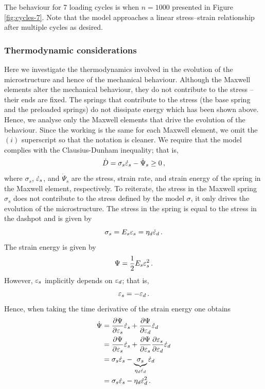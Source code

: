 \documentclass{article}
\begin{document}
The behaviour for 7 loading cycles is when $n=1000$ presented in Figure \ref{fig:cycles-7}.
Note that the model approaches a linear stress--strain relationship after multiple cycles as desired.

\subsubsection{Thermodynamic considerations}
Here we investigate the thermodynamics involved in the evolution of the microstructure and hence of the mechanical behaviour. Although the Maxwell elements alter the mechanical behaviour, they do not contribute to the stress -- their ends are fixed. The springs that contribute to the stress (the base spring and the preloaded springs) do not dissipate energy which has been shown above. Hence, we analyse only the Maxwell elements that drive the evolution of the behaviour. Since the working is the same for each Maxwell element, we omit the $(i)$ superscript so that the notation is cleaner. We require that the model complies with the Clausius-Dunham inequality; that is,
\begin{equation}
	\dot{D} = \sigma_{s} \dot{\varepsilon}_{s} - \dot{\Psi}_{s} \geq 0\,,
	\label{eq:diss}
\end{equation}
where $\sigma_{s}$, $\dot{\varepsilon}_{s}$, and $\dot{\Psi}_{s}$ are the stress, strain rate, and strain energy of the spring in the Maxwell element, respectively. To reiterate, the stress in the Maxwell spring $\sigma_{s}$ does not contribute to the stress defined by the model $\sigma$, it only drives the evolution of the microstructure. The stress in the spring is equal to the stress in the dashpot and is given by
\begin{equation}
	\sigma_{s} = E_{s}\varepsilon_{s} = \eta_{d} \dot{\varepsilon}_{d} \,.
\end{equation}
The strain energy is given by
\begin{equation}
	\Psi = \dfrac{1}{2}E_{s}\varepsilon_{s}^{2}\,.
\end{equation}
However, $\varepsilon_{s}$ implicitly depends on $\varepsilon_{d}$; that is,
\begin{equation}
	\varepsilon_{s} = -\varepsilon_{d}\,.
\end{equation}
Hence, when taking the time derivative of the strain energy one obtains
\begin{equation}
	\begin{aligned}
			\dot{\Psi} &= \dfrac{\partial \Psi}{\partial \varepsilon_{s}}\dot{\varepsilon}_{s} + \dfrac{\partial \Psi}{\partial \varepsilon_{d}}\dot{\varepsilon}_{d} \\
			&= \dfrac{\partial \Psi}{\partial \varepsilon_{s}}\dot{\varepsilon}_{s} + \dfrac{\partial \Psi}{\partial \varepsilon_{s}}\dfrac{\partial \varepsilon_{s}}{\partial \varepsilon_{d}}\dot{\varepsilon}_{d}\\
			&= \sigma_{s}\dot{\varepsilon}_{s} - \underbrace{\sigma_{s}}_{\eta_d \dot{\varepsilon}_{d}}\dot{\varepsilon}_{d}\\
			&= \sigma_{s}\dot{\varepsilon}_{s} - \eta_d\dot{\varepsilon}_{d}^{2}\,.
	\end{aligned}
\label{eq:psi-dot}
\end{equation}
\end{document}
